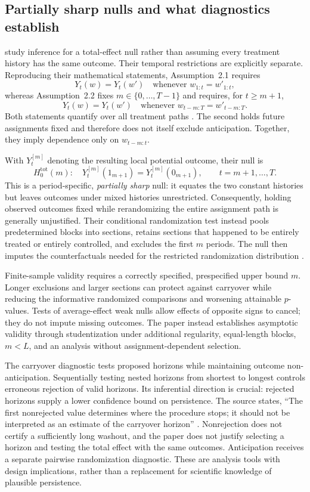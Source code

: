 \subsection{Partially sharp nulls and what diagnostics establish}

\citet{liuzhong2026} study inference for a total-effect null rather than assuming every treatment history has the same outcome. Their temporal restrictions are explicitly separate. Reproducing their mathematical statements, Assumption~2.1 requires
\[
 Y_t(w)=Y_t(w')\quad\text{whenever }w_{1:t}=w'_{1:t},
\]
whereas Assumption~2.2 fixes $m\in\{0,\ldots,T-1\}$ and requires, for $t\geq m+1$,
\[
 Y_t(w)=Y_t(w')\quad\text{whenever }w_{t-m:T}=w'_{t-m:T}.
\]
Both statements quantify over all treatment paths \citep[p.~6]{liuzhong2026}. The second holds future assignments fixed and therefore does not itself exclude anticipation. Together, they imply dependence only on $w_{t-m:t}$.

With $Y_t^{[m]}$ denoting the resulting local potential outcome, their null is
\[
 H_0^{\mathrm{tot}}(m):\quad
 Y_t^{[m]}(1_{m+1})=Y_t^{[m]}(0_{m+1}),
 \qquad t=m+1,\ldots,T.
\]
This is a period-specific, \emph{partially sharp} null: it equates the two constant histories but leaves outcomes under mixed histories unrestricted. Consequently, holding observed outcomes fixed while rerandomizing the entire assignment path is generally unjustified. Their conditional randomization test instead pools predetermined blocks into sections, retains sections that happened to be entirely treated or entirely controlled, and excludes the first $m$ periods. The null then imputes the counterfactuals needed for the restricted randomization distribution \citep[Sections~2--3]{liuzhong2026}.

Finite-sample validity requires a correctly specified, prespecified upper bound $m$. Longer exclusions and larger sections can protect against carryover while reducing the informative randomized comparisons and worsening attainable $p$-values. Tests of average-effect weak nulls allow effects of opposite signs to cancel; they do not impute missing outcomes. The paper instead establishes asymptotic validity through studentization under additional regularity, equal-length blocks, $m<L$, and an analysis without assignment-dependent selection.

The carryover diagnostic tests proposed horizons while maintaining outcome non-anticipation. Sequentially testing nested horizons from shortest to longest controls erroneous rejection of valid horizons. Its inferential direction is crucial: rejected horizons supply a lower confidence bound on persistence. The source states, ``The first nonrejected value determines where the procedure stops; it should not be interpreted as an estimate of the carryover horizon'' \citep[Section~4.1, p.~14]{liuzhong2026}. Nonrejection does not certify a sufficiently long washout, and the paper does not justify selecting a horizon and testing the total effect with the same outcomes. Anticipation receives a separate pairwise randomization diagnostic. These are analysis tools with design implications, rather than a replacement for scientific knowledge of plausible persistence.

